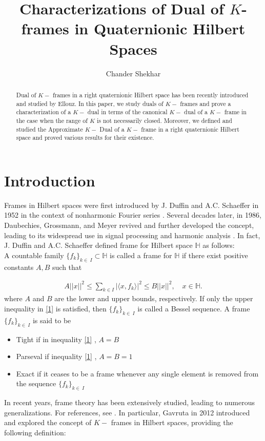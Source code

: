 \documentclass[a4paper,12pt,reqno]{amsart}
\title[Characterizations of Dual of $K$-frames in Quaternionic Hilbert Spaces ]{Characterizations of Dual of $K$-frames in Quaternionic Hilbert Spaces}
\author[Chander Shekhar]{Chander Shekhar}
\theoremstyle{plain}
\theoremstyle{remark}
\begin{document}
	\maketitle \baselineskip14pt
	\begin{abstract}
		Dual of $K-$ frames in a right quaternionic Hilbert space has been recently introduced and studied by Ellouz\cite{a}.  In this paper, we study duals of $K-$ frames and prove a characterization of a $K-$ dual in terms of the canonical $K-$ dual of a $K-$ frame in the case when the range of $K$ is not necessarily closed. Moreover, we defined and studied the Approximate $K-$ Dual of a $K-$ frame in a right quaternionic Hilbert space and proved various results for their existence. 
	\end{abstract}
	
	
	
	\section{Introduction}
	Frames in Hilbert spaces were first introduced by J. Duffin and A.C. Schaeffer in 1952 in the context of nonharmonic Fourier series \cite{k}. Several decades later, in 1986, Daubechies, Grossmann, and Meyer revived and further developed the concept, leading to its widespread use in signal processing and harmonic analysis \cite{l}. In fact, J. Duffin and A.C. Schaeffer \cite{k} defined frame for Hilbert space $\mathbb{H}$ as follows: \\
	A countable family $\{f_k\}_{k\in\ I}\subset\mathbb{H}$ is called a frame for $\mathbb{H}$ if there exist positive constants $A, B$ such that 
	
	\begin{align}\label{1}
		A||x||^2\le\sum_{k \in I}|\langle x, f_k\rangle|^2\le B||x||^2, \quad x\in \mathbb{H}.
	\end{align}
	where $A$ and $B$ are the lower and upper bounds, respectively. 
	If only the upper inequality in \eqref{1}  is satisfied, then $\{f_k\}_{k\in\ I}$ is called a Bessel sequence. A frame $\{f_k\}_{k\in\ I}$ is said to be
	\begin{itemize}
		\item Tight if in inequality \eqref{1} , $A=B$
		\item Parseval if inequality \eqref{1} , $A=B=1$
		\item Exact if it ceases to be a frame whenever any single element is removed from the sequence $\{f_k\}_{k\in\ I}$
	\end{itemize}
	In recent years, frame theory has been extensively studied, leading to numerous generalizations. For references, see \cite{b,c,d,e,f, h,i, j,m,n,q}. In particular, Gavruta \cite{e} in 2012 introduced and explored the concept of $K-$ frames in Hilbert spaces, providing the following definition:
	
\end{document}

